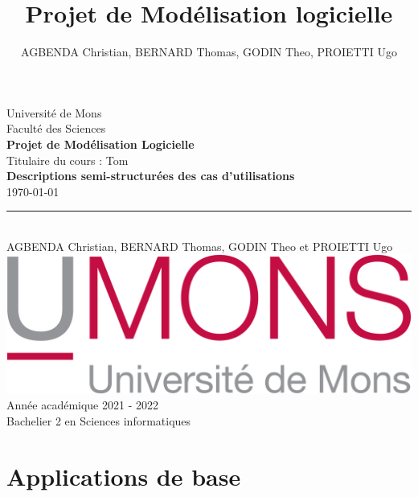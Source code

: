 \documentclass[french, a4paper, 12pt]{article}
\begin{document}
\nocite{*}

\begin{titlepage}
\begin{center}

Université de Mons\\Faculté des Sciences \\ \vspace{5mm}
\textbf{Projet de Modélisation Logicielle} \\ \vspace{5mm}
Titulaire du cours : Tom  \\        \vspace{25mm}
\LARGE{\textbf{Descriptions semi-structurées des cas d'utilisations }\\            \vspace{2mm}
}
\small{\today}\\
\rule{10cm}{3pt}\\                           \vspace{10mm}
\LARGE{AGBENDA Christian, BERNARD Thomas, GODIN Theo et PROIETTI Ugo  \bsc{}  \bsc{} } \\
\vspace{50mm}
\includegraphics[scale=0.25]{UMons.png}\\
\vspace{20pt}
Année académique 2021 - 2022\\
Bachelier 2 en Sciences informatiques\\
\end{center}

\end{titlepage}

\title{Projet de Modélisation logicielle}
\author{AGBENDA Christian, BERNARD Thomas, GODIN Theo, PROIETTI Ugo}
\maketitle
\tableofcontents
\newpage


\section{Applications de base}
\end{document}
